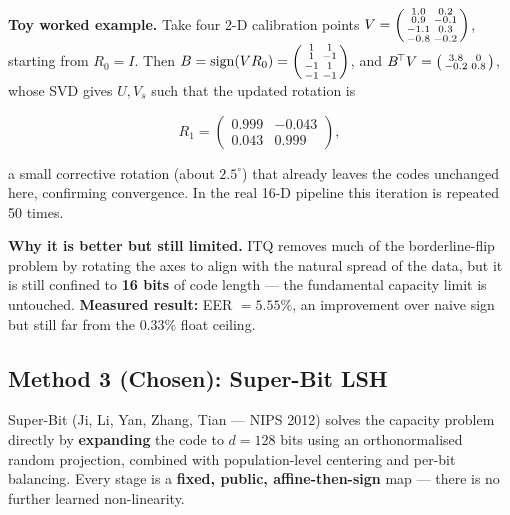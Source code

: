 \documentclass[11pt]{article}
\begin{document}
\textbf{Toy worked example.} Take four 2-D calibration points
$V = \begin{psmallmatrix}1.0 & 0.2\\ 0.9 & -0.1\\ -1.1 & 0.3\\ -0.8 & -0.2\end{psmallmatrix}$,
starting from $R_0 = I$. Then $B = \mathrm{sign}(VR_0) =
\begin{psmallmatrix}1&1\\1&-1\\-1&1\\-1&-1\end{psmallmatrix}$, and
$B^{\!\top}V = \begin{psmallmatrix}3.8 & 0\\ -0.2 & 0.8\end{psmallmatrix}$, whose SVD gives
$U,V_s$ such that the updated rotation is

\begin{equation}
R_1 = \begin{pmatrix} 0.999 & -0.043 \\ 0.043 & 0.999 \end{pmatrix},
\end{equation}

a small corrective rotation (about $2.5^{\circ}$) that already leaves the codes unchanged
here, confirming convergence. In the real 16-D pipeline this iteration is repeated 50
times.

\textbf{Why it is better but still limited.} ITQ removes much of the borderline-flip
problem by rotating the axes to align with the natural spread of the data, but it is still
confined to \textbf{16 bits} of code length --- the fundamental capacity limit is
untouched. \textbf{Measured result:} EER $=5.55\%$, an improvement over naive sign but
still far from the $0.33\%$ float ceiling.

\subsection{Method 3 (Chosen): Super-Bit LSH}

Super-Bit (Ji, Li, Yan, Zhang, Tian --- NIPS 2012) solves the capacity problem directly by
\textbf{expanding} the code to $d=128$ bits using an orthonormalised random projection,
combined with population-level centering and per-bit balancing. Every stage is a
\textbf{fixed, public, affine-then-sign} map --- there is no further learned non-linearity.
\end{document}
